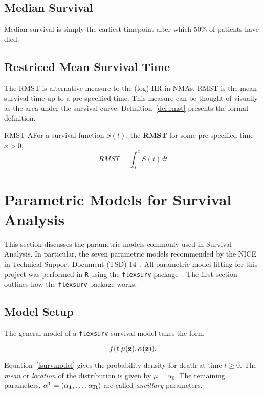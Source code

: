 \subsection{Median Survival}
Median survival is simply the earliest timepoint after which 50\% of patients have died. 

\subsection{Restriced Mean Survival Time}
The RMST is alternative measure to the (log) HR in NMAs. RMST is the mean survival time up to a pre-specified time. This measure can be thought of visually as the area under the survival curve. Definition~\ref{def:rmst} presents the formal definition.


\begin{definition}[label=def:rmst]{RMST}
    AFor a survival function $S(t)$, the \textbf{RMST} for some pre-specified time $x > 0$,
    \begin{equation}
        RMST = \int_{0}^{x} S(t)dt
    \end{equation}
\end{definition}

\section{Parametric Models for Survival Analysis}
This section discusses the parametric models commonly used in Survival Analysis. In particular, the seven parametric models recommended by the NICE in Technical Support Document (TSD) 14~\cite{tsd14}. All parametric model fitting for this project was performed in \verb|R| using the \verb|flexsurv| package~\cite{flexsurv}. The first section outlines how the \verb|flexsurv| package works.

\subsection{Model Setup}
The general model of a \verb|flexsurv| survival model takes the form 

\begin{equation}
    \label{fsurvmodel}
    f(t|\mu(\bf{z}), \bf{\alpha}(\bf{z})).
\end{equation}

Equation~\ref{fsurvmodel} gives the probability density for death at time $t \geq 0$. The \textit{mean} or \textit{location} of the distribution is given by $\mu = \alpha_0$. The remaining parameters, $\bf{\alpha^1} = (\alpha_1, \ldots, \alpha_R)$ are called \textit{ancillary} parameters. \\

